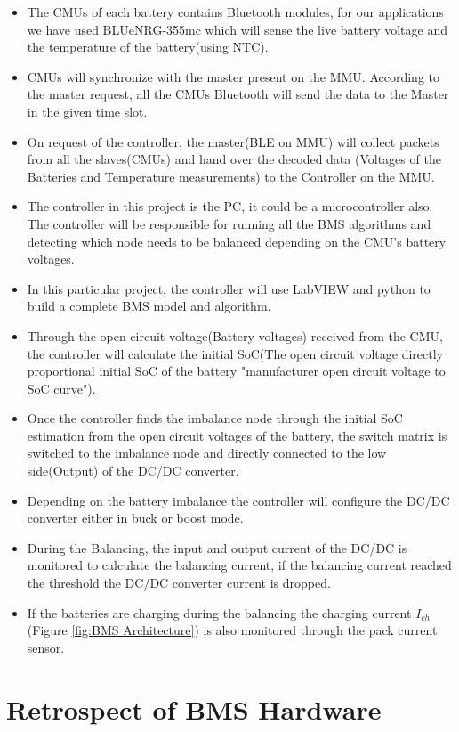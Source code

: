 \begin{itemize}
	\item The CMUs of each battery contains Bluetooth modules, for our applications we have used BLUeNRG-355mc which will sense the live battery voltage and the temperature of the battery(using NTC).
	\item CMUs will synchronize with the master present on the MMU. According to the master request, all the CMUs Bluetooth will send the data to the Master in the given time slot.
	\item On request of the controller, the master(BLE on MMU) will collect packets from all the slaves(CMUs) and hand over the decoded data (Voltages of the Batteries and Temperature measurements) to the Controller on the MMU.
	\item The controller in this project is the PC, it could be a microcontroller also. The controller will be responsible for running all the BMS algorithms and detecting which node needs to be balanced depending on the CMU's battery voltages.
	\item In this particular project, the controller will use LabVIEW and python to build a complete BMS model and algorithm.
	\item Through the open circuit voltage(Battery voltages) received from the CMU, the controller will calculate the initial SoC(The open circuit voltage directly proportional initial SoC of the battery "manufacturer open circuit voltage to SoC curve").
	\item Once the controller finds the imbalance node through the initial SoC estimation from the open circuit voltages of the battery, the switch matrix is switched to the imbalance node and directly connected to the low side(Output) of the DC/DC converter.
	\item Depending on the battery imbalance the controller will configure the DC/DC converter either in buck or boost mode.
	\item During the Balancing, the input and output current of the DC/DC is monitored to calculate the balancing current, if the balancing current reached the threshold the DC/DC converter current is dropped.
	\item If the batteries are charging during the balancing the charging current \textit{$I_{ch}$}(Figure \ref{fig:BMS Architecture}) is also monitored through the pack current sensor.
\end{itemize}
\section{Retrospect of BMS Hardware}





